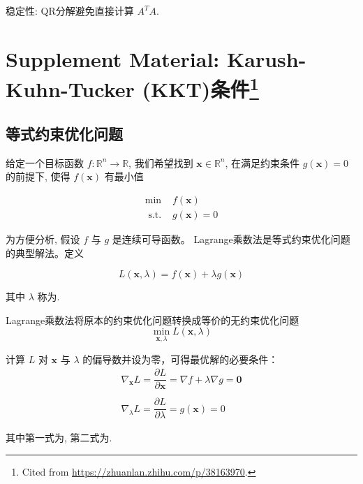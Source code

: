 稳定性: QR分解避免直接计算 $ A^{T} {A}$.

\section[Supplement Material: Karush-Kuhn-Tucker (KKT)条件]{Supplement Material: Karush-Kuhn-Tucker (KKT)条件\footnote{Cited from \url{https://zhuanlan.zhihu.com/p/38163970}.}}

\subsection{等式约束优化问题}

\begin{problem}[等式约束优化问题]
    给定一个目标函数 $ f: \mathbb{R}^{n} \rightarrow \mathbb{R} $, 我们希望找到 $ \mathbf{x} \in \mathbb{R}^{n} $, 在满足约束条件 $ g(\mathbf{x})=0 $ 的前提下, 使得 $ f(\mathbf{x}) $ 有最小值

    $$
\begin{array}{ll}
\min & f(\mathbf{x}) \\
\text { s.t. } & g(\mathbf{x})=0
\end{array}
$$
\end{problem}

为方便分析, 假设 $ f $ 与 $ g $ 是连续可导函数。 Lagrange乘数法是等式约束优化问题的典型解法。定义

\begin{definition}[Lagrangian函数]
    $$
L(\mathbf{x}, \lambda)=f(\mathbf{x})+\lambda g(\mathbf{x})
$$
\end{definition}

其中 $ \lambda $ 称为. 

\begin{theorem}
    Lagrange乘数法将原本的约束优化问题转换成等价的无约束优化问题
$$
\min _{\mathbf{x}, \lambda} L(\mathbf{x}, \lambda)
$$
\end{theorem}

\begin{theorem}[拉格朗日乘子法最优解必要条件]
    计算 $ L $ 对 $ \mathbf{x} $ 与 $ \lambda $ 的偏导数并设为零，可得最优解的必要条件：
$$
\begin{array}{l}
\nabla_{\mathbf{x}} L=\dfrac{\partial L}{\partial \mathbf{x}}=\nabla f+\lambda \nabla g=\mathbf{0} \\
\\
\nabla_{\lambda} L=\dfrac{\partial L}{\partial \lambda}=g(\mathbf{x})=0
\end{array}
$$

其中第一式为, 第二式为.
\end{theorem}


